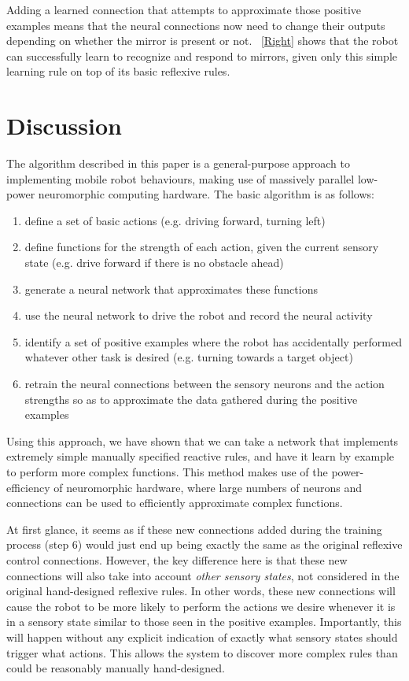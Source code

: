 \documentclass{frontiersSCNS}
\begin{document}
Adding a learned connection that attempts to approximate those positive
examples means that the neural connections now need to change their outputs
depending on whether the mirror is present or not.  \figurename~\ref{Right} shows 
that the robot can successfully learn to recognize and respond to mirrors,
given only this simple learning rule on top of its basic reflexive rules.

\section{Discussion}
The algorithm described in this paper is a general-purpose approach to
implementing mobile robot behaviours, 
making use of massively parallel low-power neuromorphic computing hardware. 
The basic algorithm is as follows:

\begin{enumerate}
\item define a set of basic actions (e.g. driving forward, turning left)
\item define functions for the strength of each action, given the
current sensory state (e.g. drive forward if there is no obstacle ahead)
\item generate a neural network that approximates these functions
\item use the neural network to drive the robot and record the neural activity
\item identify a set of positive examples where the robot has accidentally
performed whatever other task is desired (e.g. turning towards a target object)
\item retrain the neural connections between the sensory neurons and the
action strengths so as to approximate the data gathered during the positive
examples
\end{enumerate}

Using this approach, we have shown that we can take a network that
implements extremely simple manually specified reactive rules, and have
it learn by example to perform more complex functions.  This method
makes use of the power-efficiency of neuromorphic hardware, where large
numbers of neurons and connections can be used to efficiently
approximate complex functions.

At first glance, it seems as if these new connections added during the
training process (step 6) would just end up being 
exactly the same as the original reflexive control connections. However, the 
key difference here is that these new connections will also take into 
account \textit{other sensory states}, not considered in the original 
hand-designed reflexive rules. In other words, these new connections will 
cause the robot to be more likely to perform the actions we desire whenever it is in a sensory state similar to those seen in the positive examples. 
Importantly, this will happen without any explicit indication of exactly what 
sensory states should trigger what actions.  This allows the system to
discover more complex rules than could be reasonably manually hand-designed.
\end{document}
